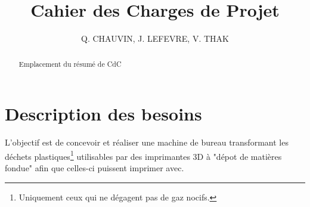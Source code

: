 \documentclass[a4paper,11pt]{article}
\title{Cahier des Charges de Projet}
\author{Q. CHAUVIN, J. LEFEVRE, V. THAK}
\begin{document}
\maketitle
\tableofcontents

\begin{abstract}

Emplacement du résumé de CdC
\end{abstract}

\section{Description des besoins}

L'objectif est de concevoir et réaliser une machine de bureau transformant les déchets plastiques\footnote{Uniquement ceux qui ne dégagent pas de gaz nocifs.} utilisables par des imprimantes 3D à "dépot de matières fondue" afin que celles-ci puissent imprimer avec.
\end{document}

